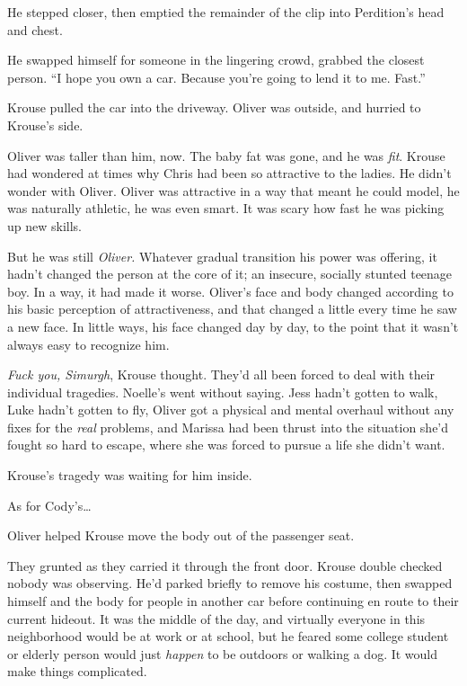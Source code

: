 He stepped closer, then emptied the remainder of the clip into Perdition's head and chest.



He swapped himself for someone in the lingering crowd, grabbed the closest person.  ``I hope you own a car.  Because you're going to lend it to me.  Fast.''



\sectionbreak



Krouse pulled the car into the driveway.  Oliver was outside, and hurried to Krouse's side.



Oliver was taller than him, now.  The baby fat was gone, and he was \emph{fit}.  Krouse had wondered at times why Chris had been so attractive to the ladies.  He didn't wonder with Oliver.  Oliver was attractive in a way that meant he could model, he was naturally athletic, he was even smart.  It was scary how fast he was picking up new skills.



But he was still \emph{Oliver.  }Whatever gradual transition his power was offering, it hadn't changed the person at the core of it; an insecure, socially stunted teenage boy.  In a way, it had made it worse.  Oliver's face and body changed according to his basic perception of attractiveness, and that changed a little every time he saw a new face.  In little ways, his face changed day by day, to the point that it wasn't always easy to recognize him.



\emph{Fuck you, Simurgh}, Krouse thought.  They'd all been forced to deal with their individual tragedies.  Noelle's went without saying.  Jess hadn't gotten to walk, Luke hadn't gotten to fly, Oliver got a physical and mental overhaul without any fixes for the \emph{real} problems, and Marissa had been thrust into the situation she'd fought so hard to escape, where she was forced to pursue a life she didn't want.



Krouse's tragedy was waiting for him inside.



As for Cody's\ldots



Oliver helped Krouse move the body out of the passenger seat.



They grunted as they carried it through the front door.  Krouse double checked nobody was observing.  He'd parked briefly to remove his costume, then swapped himself and the body for people in another car before continuing en route to their current hideout.  It was the middle of the day, and virtually everyone in this neighborhood would be at work or at school, but he feared some college student or elderly person would just \emph{happen} to be outdoors or walking a dog.  It would make things complicated.



